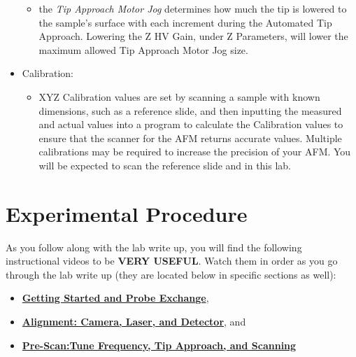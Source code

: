 \documentclass{../lab}
\begin{document}
\begin{itemize}
\begin{itemize}
        \item the \emph{Tip Approach Motor Jog} determines how much the tip is lowered to the sample's surface with each increment during the Automated Tip Approach.  Lowering the Z HV Gain, under Z Parameters, will lower the maximum allowed Tip Approach Motor Jog size.

    \end{itemize}

    \item Calibration:

    \begin{itemize}
        \item ​XYZ Calibration values are set by scanning a sample with known dimensions, such as a reference slide, and then inputting the measured and actual values into a program to calculate the Calibration values to ensure that the scanner for the AFM returns accurate values.  Multiple calibrations may be required to increase the precision of your AFM.  You will be expected to scan the reference slide and  in this lab.

    \end{itemize}

\end{itemize}

\section{Experimental Procedure}

As you follow along with the lab write up, you will find the following instructional videos to be \textbf{VERY USEFUL}. Watch them in order as you go through the lab write up (they are located below in specific sections as well):

\begin{itemize}
    \item \href{http://experimentationlab.berkeley.edu/sites/default/files/gettingstarted\_final2.mp4}{\textbf{Getting Started and Probe Exchange}},

    \item \href{http://experimentationlab.berkeley.edu/sites/default/files/alignment\_final2.mp4}{\textbf{Alignment: Camera, Laser, and Detector}}, and

    \item \href{http://experimentationlab.berkeley.edu/sites/default/files/prescan\_final2.mp4}{\textbf{Pre-Scan:Tune Frequency, Tip Approach, and Scanning}}

\end{itemize}
\end{document}
